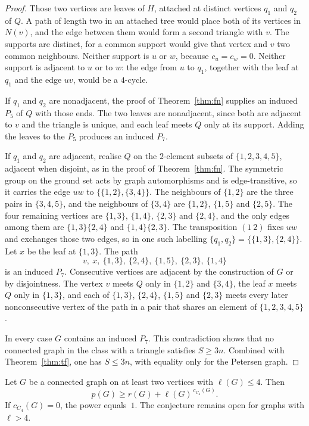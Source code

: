 \documentclass[ASNA]{USG}
\theoremstyle{WBstyletwo}
\numberwithin{equation}{section}
\newcommand{\lr}{\ell}
\newcommand{\pp}{p}
\begin{document}
\begin{proof}
Those two vertices are leaves of $H$, attached at distinct vertices $q_1$ and $q_2$ of $Q$. A path of length two in an attached tree would place both of its vertices in $N(v)$, and the edge between them would form a second triangle with $v$. The supports are distinct, for a common support would give that vertex and $v$ two common neighbours. Neither support is $u$ or $w$, because $c_u=c_w=0$. Neither support is adjacent to $u$ or to $w$: the edge from $u$ to $q_1$, together with the leaf at $q_1$ and the edge $uv$, would be a $4$-cycle.

If $q_1$ and $q_2$ are nonadjacent, the proof of Theorem~\ref{thm:fn} supplies an induced $P_5$ of $Q$ with those ends. The two leaves are nonadjacent, since both are adjacent to $v$ and the triangle is unique, and each leaf meets $Q$ only at its support. Adding the leaves to the $P_5$ produces an induced $P_7$.

If $q_1$ and $q_2$ are adjacent, realise $Q$ on the $2$-element subsets of $\{1,2,3,4,5\}$, adjacent when disjoint, as in the proof of Theorem~\ref{thm:fn}. The symmetric group on the ground set acts by graph automorphisms and is edge-transitive, so it carries the edge $uw$ to $\{\{1,2\},\{3,4\}\}$. The neighbours of $\{1,2\}$ are the three pairs in $\{3,4,5\}$, and the neighbours of $\{3,4\}$ are $\{1,2\}$, $\{1,5\}$ and $\{2,5\}$. The four remaining vertices are $\{1,3\}$, $\{1,4\}$, $\{2,3\}$ and $\{2,4\}$, and the only edges among them are $\{1,3\}\{2,4\}$ and $\{1,4\}\{2,3\}$. The transposition $(1\ 2)$ fixes $uw$ and exchanges those two edges, so in one such labelling $\{q_1,q_2\}=\{\{1,3\},\{2,4\}\}$. Let $x$ be the leaf at $\{1,3\}$. The path
\[
v,\ x,\ \{1,3\},\ \{2,4\},\ \{1,5\},\ \{2,3\},\ \{1,4\}
\]
is an induced $P_7$. Consecutive vertices are adjacent by the construction of $G$ or by disjointness. The vertex $v$ meets $Q$ only in $\{1,2\}$ and $\{3,4\}$, the leaf $x$ meets $Q$ only in $\{1,3\}$, and each of $\{1,3\}$, $\{2,4\}$, $\{1,5\}$ and $\{2,3\}$ meets every later nonconsecutive vertex of the path in a pair that shares an element of $\{1,2,3,4,5\}$.

In every case $G$ contains an induced $P_7$. This contradiction shows that no connected graph in the class with a triangle satisfies $S\ge 3n$. Combined with Theorem~\ref{thm:tf}, one has $S\le 3n$, with equality only for the Petersen graph.
\end{proof}


\begin{theorem}\label{thm:A}\label{cor:real133}
Let $G$ be a connected graph on at least two vertices with $\lr(G)\le 4$. Then
\[
\pp(G)\ge r(G)+\lr(G)^{\,c_{C_4}(G)}.
\]
If $c_{C_4}(G)=0$, the power equals~$1$. The conjecture remains open for graphs with $\lr>4$.
\end{theorem}
\end{document}
